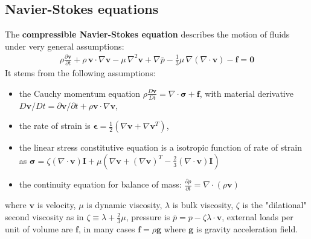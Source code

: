 \documentclass{digitaldynamics}
\def\vect#1{\bm{#1}}
\def\tensor#1{\bm{#1}}
\begin{document}
\subsection{Navier-Stokes equations}

The \textbf{compressible Navier-Stokes equation} describes the motion of fluids under very general assumptions:
\begin{align}
		 \rho \frac{\partial \vect{v}}{\partial t} + \rho \,\vect{v} \cdot \nabla \vect{v} - \mu \, \nabla^2 \vect{v} + \nabla \bar{p}  - \tfrac13 \mu \, \nabla (\nabla\cdot\vect{v}) - \vect{f} = \vect{0}
\label{eq:navierstokes}
\end{align}
It stems from the following assumptions:
\begin{itemize}
	\item the Cauchy momentum equation $\rho \frac{D\vect{v}}{Dt} = \nabla \cdot \tensor{\sigma} + \vect{f}$, with material derivative $D\vect{v}/Dt = \partial \vect{v}/\partial t + \rho \vect{v} \cdot \nabla \vect{v}$,
	\item the rate of strain is $\tensor{\epsilon}=\frac{1}{2}(\nabla\vect{v}+\nabla{\vect{v}}^T)$,
	\item the linear stress constitutive equation is a isotropic function of rate of strain as 
	$\tensor{\sigma} = \zeta (\nabla\cdot\vect{v}) \mathbf I + \mu \left(\nabla\vect{v} + ( \nabla\vect{v} )^{T} - \tfrac23 (\nabla\cdot\vect{v}) \tensor{I}\right)$ 
	\item the continuity equation for balance of mass: $\frac{\partial \rho}{\partial t} = \nabla \cdot (\rho\vect{v})$
\end{itemize}
where $\vect{v}$ is velocity, $\mu$ is dynamic viscosity, $\lambda$ is bulk viscosity, $\zeta$ is the "dilational" second viscosity as in $\zeta \equiv \lambda + \tfrac23 \mu$, pressure is $\bar{p}= p - \zeta \lambda \cdot \vect{v}$, external loads per unit of volume are $\vect{f}$, in many cases $\vect{f}=\rho\vect{g}$ where $\vect{g}$ is gravity acceleration field.
\end{document}
